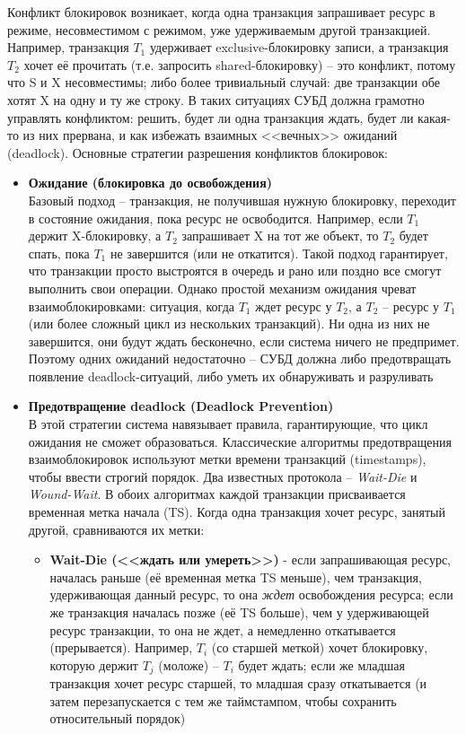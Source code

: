  Конфликт блокировок возникает, когда одна транзакция запрашивает ресурс в режиме, несовместимом с режимом, уже удерживаемым другой транзакцией. Например, транзакция $T_1$ удерживает exclusive-блокировку записи, а транзакция $T_2$ хочет её прочитать (т.е. запросить shared-блокировку) – это конфликт, потому что S и X несовместимы; либо более тривиальный случай: две транзакции обе хотят X на одну и ту же строку. В таких ситуациях СУБД должна грамотно управлять конфликтом: решить, будет ли одна транзакция ждать, будет ли какая-то из них прервана, и как избежать взаимных <<вечных>> ожиданий (deadlock). Основные стратегии разрешения конфликтов блокировок:
 \begin{itemize}
    \item \textbf{Ожидание (блокировка до освобождения)} ~\\
    Базовый подход – транзакция, не получившая нужную блокировку, переходит в состояние ожидания, пока ресурс не освободится. Например, если $T_1$ держит X-блокировку, а $T_2$ запрашивает X на тот же объект, то $T_2$ будет спать, пока $T_1$ не завершится (или не откатится). Такой подход гарантирует, что транзакции просто выстроятся в очередь и рано или поздно все смогут выполнить свои операции. Однако простой механизм ожидания чреват взаимоблокировками: ситуация, когда $T_1$ ждет ресурс у $T_2$, а $T_2$ – ресурс у $T_1$ (или более сложный цикл из нескольких транзакций). Ни одна из них не завершится, они будут ждать бесконечно, если система ничего не предпримет. Поэтому одних ожиданий недостаточно – СУБД должна либо предотвращать появление deadlock-ситуаций, либо уметь их обнаруживать и разруливать 
    \item \textbf{Предотвращение deadlock (Deadlock Prevention)} ~\\
    В этой стратегии система навязывает правила, гарантирующие, что цикл ожидания не сможет образоваться. Классические алгоритмы предотвращения взаимоблокировок используют метки времени транзакций (timestamps), чтобы ввести строгий порядок. Два известных протокола – \textit{Wait-Die} и \textit{Wound-Wait}. В обоих алгоритмах каждой транзакции присваивается временная метка начала (TS). Когда одна транзакция хочет ресурс, занятый другой, сравниваются их метки: 
    \begin{itemize}
        \item \textbf{Wait-Die (<<ждать или умереть>>)} - если запрашивающая ресурс, началась раньше (её временная метка TS меньше), чем транзакция, удерживающая данный ресурс, то она \textit{ждет} освобождения ресурса; если же транзакция началась позже (её TS больше), чем у удерживающей ресурс транзакции, то она не ждет, а немедленно откатывается (прерывается). Например, $T_i$ (со старшей меткой) хочет блокировку, которую держит $T_j$ (моложе) – $T_i$ будет ждать; если же младшая транзакция хочет ресурс старшей, то младшая сразу откатывается (и затем перезапускается с тем же таймстампом, чтобы сохранить относительный порядок)

\end{itemize}
\end{itemize}
